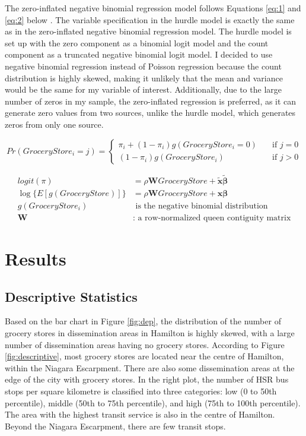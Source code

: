 \documentclass[preprint, 3p,
authoryear]{elsarticle} %
\begin{document}
The zero-inflated negative binomial regression model follows Equations
\ref{eq:1} and \ref{eq:2} below \citep{zinb}. The variable specification
in the hurdle model is exactly the same as in the zero-inflated negative
binomial regression model. The hurdle model is set up with the zero
component as a binomial logit model and the count component as a
truncated negative binomial logit model. I decided to use negative
binomial regression instead of Poisson regression because the count
distribution is highly skewed, making it unlikely that the mean and
variance would be the same for my variable of interest. Additionally,
due to the large number of zeros in my sample, the zero-inflated
regression is preferred, as it can generate zero values from two
sources, unlike the hurdle model, which generates zeros from only one
source.

\begin{equation}
\label{eq:1}
Pr(GroceryStore_i=j) = \begin{cases}
       \pi_i + (1-\pi_i)g(GroceryStore_i=0) &\quad\text{if } j=0\\
       (1-\pi_i)g(GroceryStore_i) &\quad\text{if } j>0
     \end{cases}
\end{equation}

\begin{equation}
\label{eq:2}
\begin{aligned}
logit(\pi) &= \rho \mathbf{W} GroceryStore + \tilde{\mathbf{x}} \tilde{\boldsymbol{\beta}} \\
\log\{E[g(GroceryStore)]\} &= \rho \mathbf{W} GroceryStore + \mathbf{x} \boldsymbol{\beta} \\
g(GroceryStore_i) &\text{ is the negative binomial distribution} \\
\mathbf{W} &\text{: a row-normalized queen contiguity matrix}
\end{aligned}
\end{equation}

\section{Results}\label{results}

\subsection{Descriptive Statistics}\label{descriptive-statistics}

Based on the bar chart in Figure \ref{fig:dep}, the distribution of the
number of grocery stores in dissemination areas in Hamilton is highly
skewed, with a large number of dissemination areas having no grocery
stores. According to Figure \ref{fig:descriptive}, most grocery stores
are located near the centre of Hamilton, within the Niagara Escarpment.
There are also some dissemination areas at the edge of the city with
grocery stores. In the right plot, the number of HSR bus stops per
square kilometre is classified into three categories: low (0 to 50th
percentile), middle (50th to 75th percentile), and high (75th to 100th
percentile). The area with the highest transit service is also in the
centre of Hamilton. Beyond the Niagara Escarpment, there are few transit
stops.
\end{document}
